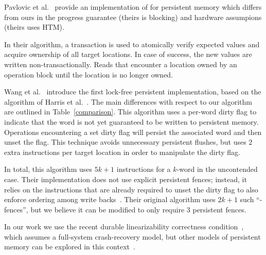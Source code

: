 Pavlovic et al.~\cite{pavlovic18} provide an implementation of \mcas{} for persistent memory which differs from ours in the progress guarantee (theirs is blocking) and hardware assumpions (theirs uses HTM). 
\begin{camera} 
\end{camera}\begin{arxiv} 
In their algorithm, a transaction is used to atomically verify expected values and acquire ownership of all target locations. In case of success, the new values are written non-transactionally. Reads that encounter a location owned by an \mcas{} operation block until the location is no longer owned.
\end{arxiv}

Wang et al.~\cite{arulraj18,wang18} introduce the first lock-free persistent implementation, based on the algorithm of Harris et al.~\cite{harris02}. The main differences with respect to our algorithm are outlined in Table~\ref{comparison}. This algorithm uses a per-word dirty flag to indicate that the word is not yet guaranteed to be written to persistent memory. Operations encountering a set dirty flag will persist the associated word and then unset the flag. This technique avoids unnecessary persistent flushes, but uses 2 extra \cas{} instructions per target location in order to manipulate the dirty flag. \begin{camera}
\end{camera}\begin{arxiv}
In total, this algorithm uses $5k+1$ \cas{} instructions for a $k$-word \mcas{} in the uncontended case. Their implementation does not use explicit persistent fences; instead, it relies on the \cas{} instructions that are already required to unset the dirty flag to also enforce ordering among write backs~\cite{intel}. Their original algorithm uses $2k+1$ such ``\cas{}-fences'', but we believe it can be modified to only require 3 persistent fences.
\end{arxiv}

In our work we use the recent durable linearizability correctness condition~\cite{izraelevitz16}, which assumes a full-system crash-recovery model, but other models of persistent memory can be explored in this context~\cite{aguilera2003strict, BerryhillGT15, ConditNFILBC09, GuerraouiL04, PelleyCW15}.

